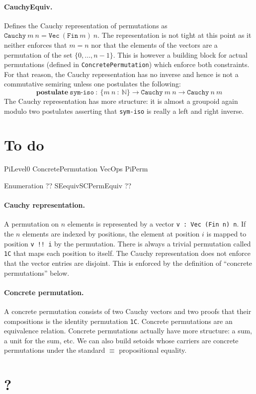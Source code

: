 \documentclass{article}
\begin{document}
\paragraph*{CauchyEquiv.} Defines the Cauchy representation of
permutations as
$\texttt{Cauchy}~m~n = \texttt{Vec}~(\texttt{Fin}~m)~n$. The
representation is not tight at this point as it neither enforces that
$m=n$ nor that the elements of the vectors are a permutation of the
set $\{0,\ldots,n-1\}$. This is however a building block for actual
permutations (defined in \texttt{ConcretePermutation}) which enforce
both constraints. For that reason, the Cauchy representation has no
inverse and hence is not a commutative semiring unless one postulates
the following:
\[
\textbf{postulate}~\texttt{sym-iso}~:~\{m~n~:~\mathbb{N}\} \rightarrow
  \texttt{Cauchy}~m~n \rightarrow \texttt{Cauchy}~n~m
\]
The Cauchy representation has more structure: it is almost a groupoid
again modulo two postulates asserting that \texttt{sym-iso} is really
a left and right inverse.

\section{To do}

PiLevel0
ConcretePermutation
VecOps
PiPerm

Enumeration ??
SEequivSCPermEquiv ??


\paragraph*{Cauchy representation.} A permutation on $n$ elements is represented by a vector \texttt{v : Vec (Fin n) n}. If the $n$ elements are indexed by positions, the element at position $i$ is mapped to position \texttt{v !! i} by the permutation. There is always a trivial permutation called \texttt{1C} that maps each position to itself. The Cauchy representation does not enforce that the vector entries are disjoint. This is enforced by the definition of ``concrete permutations'' below. 

\paragraph*{Concrete permutation.} A concrete permutation consists of two Cauchy vectors and two proofs that their compositions is the identity permutation \texttt{1C}. Concrete permutations are an equivalence relation. Concrete permutations actually have more structure: a sum, a unit for the sum, etc. We can also build setoids whose carriers are concrete permutations under the standard $\equiv$ propositional equality.

\section{?}


\end{document}
